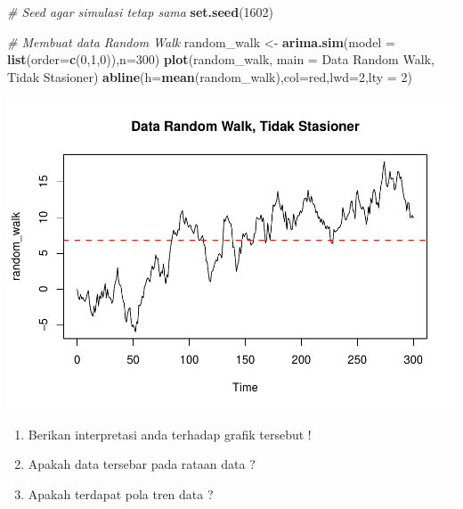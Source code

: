 \documentclass[
]{book}
\newenvironment{Shaded}{\begin{snugshade}}{\end{snugshade}}
\newcommand{\AttributeTok}[1]{\textcolor[rgb]{0.13,0.29,0.53}{#1}}
\newcommand{\CommentTok}[1]{\textcolor[rgb]{0.56,0.35,0.01}{\textit{#1}}}
\newcommand{\DecValTok}[1]{\textcolor[rgb]{0.00,0.00,0.81}{#1}}
\newcommand{\FunctionTok}[1]{\textcolor[rgb]{0.13,0.29,0.53}{\textbf{#1}}}
\newcommand{\NormalTok}[1]{#1}
\newcommand{\OtherTok}[1]{\textcolor[rgb]{0.56,0.35,0.01}{#1}}
\newcommand{\StringTok}[1]{\textcolor[rgb]{0.31,0.60,0.02}{#1}}
\begin{document}
\begin{Shaded}
\begin{Highlighting}[]
\CommentTok{\# Seed agar simulasi tetap sama}
\FunctionTok{set.seed}\NormalTok{(}\DecValTok{1602}\NormalTok{)}

\CommentTok{\# Membuat data Random Walk}
\NormalTok{random\_walk }\OtherTok{\textless{}{-}} \FunctionTok{arima.sim}\NormalTok{(}\AttributeTok{model =} \FunctionTok{list}\NormalTok{(}\AttributeTok{order=}\FunctionTok{c}\NormalTok{(}\DecValTok{0}\NormalTok{,}\DecValTok{1}\NormalTok{,}\DecValTok{0}\NormalTok{)),}\AttributeTok{n=}\DecValTok{300}\NormalTok{)}
\FunctionTok{plot}\NormalTok{(random\_walk, }\AttributeTok{main =} \StringTok{\textquotesingle{}Data Random Walk, Tidak Stasioner\textquotesingle{}}\NormalTok{)}
\FunctionTok{abline}\NormalTok{(}\AttributeTok{h=}\FunctionTok{mean}\NormalTok{(random\_walk),}\AttributeTok{col=}\StringTok{\textquotesingle{}red\textquotesingle{}}\NormalTok{,}\AttributeTok{lwd=}\DecValTok{2}\NormalTok{,}\AttributeTok{lty =} \DecValTok{2}\NormalTok{)}
\end{Highlighting}
\end{Shaded}

\begin{center}\includegraphics{_main_files/figure-latex/Contoh Plot yang Stasioner a Tidak Stasioner-1} \end{center}
\begin{jp}{}{}
\begin{enumerate}
\item Berikan interpretasi anda terhadap grafik tersebut !  
\item Apakah data tersebar pada rataan data ?  
\item Apakah terdapat pola tren data ?
\end{enumerate}
\end{jp}
\end{document}

